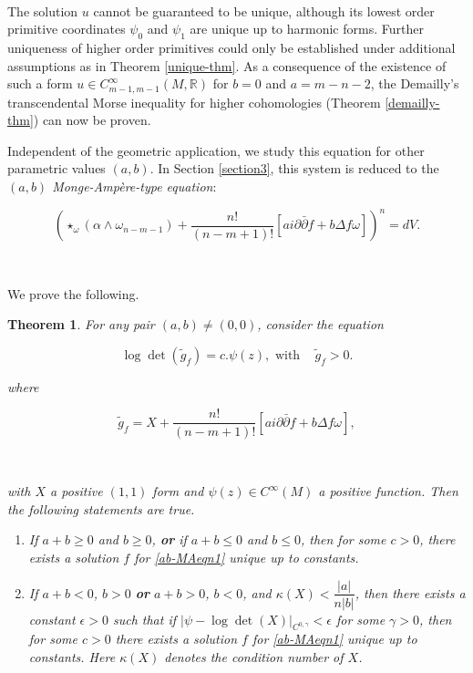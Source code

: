 \documentclass[10pt,a4paper]{amsart}
\newcommand{\pbp}{\partial \bar{\partial}}
\newtheorem{theorem}{Theorem}[section]
\numberwithin{equation}{section}
\begin{document}
\


The solution $u$ cannot be guaranteed to be unique, although its lowest order primitive coordinates $\psi_0$ and $\psi_1$ are unique up to harmonic forms. Further uniqueness of higher order primitives could only be established under additional assumptions as in Theorem \ref{unique-thm}. As a consequence of the existence of such a form $u \in C^{\infty}_{m-1,m-1}(M, \mathbb R)$ for $b=0$ and $a = m-n-2 $, the Demailly's transcendental Morse inequality for higher cohomologies (Theorem \ref{demailly-thm}) can now be proven.


Independent of the geometric application, we study this equation for other parametric values $(a,b)$. In Section \ref{section3}, this system is reduced to the {\em $(a,b)$ Monge-Amp\`ere-type equation}: 

$$    \left(\star_{\omega}(\alpha \wedge \omega_{n-m-1}) + \frac{n!}{(n-m+1)!} \left[ a i\pbp f + b \Delta f \omega\right] \right)^n = dV.$$

\

We prove the following.

\begin{theorem} \label{ab-MAeqn-theorem}
For any pair $(a,b) \neq (0,0)$, consider the equation

\begin{equation}\label{ab-MAeqn1}
    \log\det(\tilde g_f) = c.\psi(z), \text{ with }\;\;\; \tilde g_f >0.
\end{equation}

\noindent where

$$\tilde g_f = X + \frac{n!}{(n-m+1)!} \left[ a i\pbp f + b \Delta f \omega\right],$$

\

\noindent with $X$ a positive $(1,1)$ form and $\psi(z) \in C^{\infty}(M)$ a positive function. Then the following statements are true.

\begin{enumerate}[label=\Roman*.]
    \item \label{a} If $a+b\geq 0$ and $b \geq 0$, \textbf{or} if $a+b \leq 0$ and $b \leq 0$, then for some $c>0$, there exists a solution $f$ for \eqref{ab-MAeqn1} unique up to constants.

    
    \item \label{b} If $a+b < 0$, $b > 0$ \textbf{or} $a+b >0$, $b < 0$, and $\kappa(X) < \dfrac{|a|}{n|b|}$, then there exists a constant $\epsilon>0$ such that if $|\psi - \log\det(X)|_{C^{0, \gamma}}< \epsilon$ for some $\gamma >0 $, then for some $c>0$ there exists a solution $f$ for \eqref{ab-MAeqn1} unique up to constants. Here $\kappa(X)$ denotes the condition number of $X$.
\end{enumerate}





\end{theorem}
\end{document}
